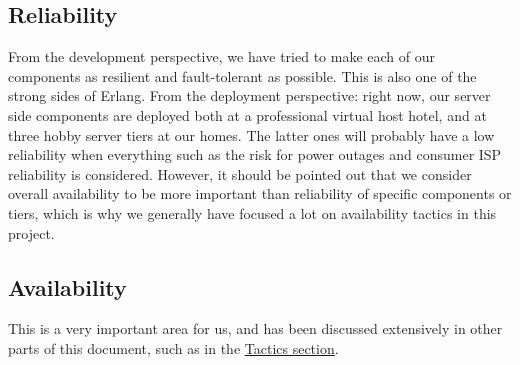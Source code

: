 \subsection{Reliability}
From the development perspective, we have tried to make each of our components
as resilient and fault-tolerant as possible. This is also one of the strong
sides of Erlang. \newline
From the deployment perspective: right now, our server side components are
deployed both at a professional virtual host hotel, and at three hobby server
tiers at our homes. The latter ones will probably have a low reliability when
everything such as the risk for power outages and consumer ISP reliability is
considered. \newline
However, it should be pointed out that we consider overall availability to be
more important than reliability of specific components or tiers, which is why we
generally have focused a lot on availability tactics in this project.

\subsection{Availability}
This is a very important area for us, and has been discussed extensively in
other parts of this document, such as in the \hyperlink{tactics}{Tactics
section}.